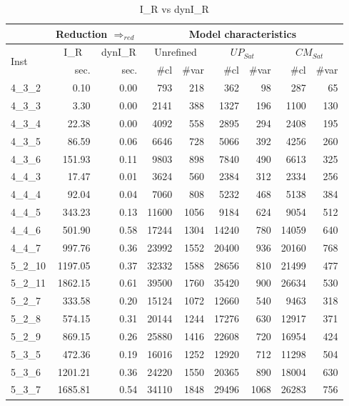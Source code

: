 \documentclass[3p,authoryear,times]{elsarticle}
\newcommand{\rmin}[0]{{\Rightarrow_{red}}}
\begin{document}
\begin{table}
\caption{I\_R vs dynI\_R}
\label{tab:IMPvsNIMP}
\begin{center}
\begin{tabular}{|l || r | r || r |r  |r |r |r | r|}
\cline{2-9}
\multicolumn{1}{c|}{}&\multicolumn{2}{c||}{Reduction $\rmin$}&\multicolumn{6}{c|}{Model characteristics}\\
\hline
\multirow{2}{*}{Inst}&\multicolumn{1}{c|}{I\_R}&\multicolumn{1}{c||}{dynI\_R}	&\multicolumn{2}{c|}{Unrefined}		&\multicolumn{2}{c|}{$UP_{Sat}$}	&\multicolumn{2}{c|}{$CM_{Sat}$}\\
&sec.&sec.	&\#cl		&\#var	&\#cl	&\#var	&\#cl	&\#var\\
\hline
\hline
4\_3\_2&0.10&0.00&793&218&362&98&287&65 \\ \hline
4\_3\_3&3.30&0.00&2141&388&1327&196&1100&130 \\ \hline
4\_3\_4&22.38&0.00&4092&558&2895&294&2408&195 \\ \hline
4\_3\_5&86.59&0.06&6646&728&5066&392&4256&260 \\ \hline
4\_3\_6&151.93&0.11&9803&898&7840&490&6613&325 \\ \hline
4\_4\_3&17.47&0.01&3624&560&2384&312&2334&256 \\ \hline
4\_4\_4&92.04&0.04&7060&808&5232&468&5138&384 \\ \hline
4\_4\_5&343.23&0.13&11600&1056&9184&624&9054&512 \\ \hline
4\_4\_6&501.90&0.58&17244&1304&14240&780&14059&640 \\ \hline
4\_4\_7&997.76&0.36&23992&1552&20400&936&20160&768 \\ \hline
5\_2\_10&1197.05&0.37&32332&1588&28656&810&21499&477 \\ \hline
5\_2\_11&1862.15&0.61&39500&1760&35420&900&26634&530 \\ \hline
5\_2\_7&333.58&0.20&15124&1072&12660&540&9463&318 \\ \hline
5\_2\_8&574.15&0.31&20144&1244&17276&630&12917&371 \\ \hline
5\_2\_9&869.15&0.26&25880&1416&22608&720&16954&424 \\ \hline
5\_3\_5&472.36&0.19&16016&1252&12920&712&11298&504 \\ \hline
5\_3\_6&1201.21&0.36&24220&1550&20365&890&18004&630 \\ \hline
5\_3\_7&1685.81&0.54&34110&1848&29496&1068&26283&756 \\ \hline
\end{tabular}
\end{center}
\end{table}
\end{document}
